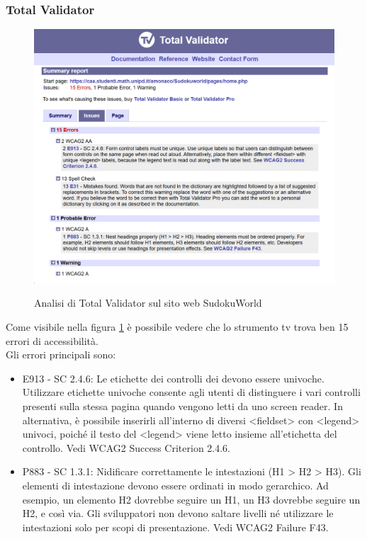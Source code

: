 \subsubsection{Total Validator}
\begin{figure}[H]
    \centering
    \includegraphics[width=0.7\linewidth, alt={Screenshot dell'analisi di Total Validator sul sito web SudokuWorld}]{img/TV_sudoku.png}
    \caption{Analisi di Total Validator sul sito web SudokuWorld}\label{fig:TV_sudoku}
\end{figure}

\noindent Come visibile nella figura \ref{fig:TV_sudoku} è possibile vedere che lo strumento \acrshort{tv} trova ben 15 errori di accessibilità.\\
Gli errori principali sono: 
\begin{itemize}
    \item E913 - SC 2.4.6: Le etichette dei controlli dei  devono essere univoche. Utilizzare etichette univoche consente agli utenti di distinguere i vari controlli presenti sulla stessa pagina quando vengono letti da uno screen reader. In alternativa, è possibile inserirli all’interno di diversi <fieldset> con <legend> univoci, poiché il testo del <legend> viene letto insieme all’etichetta del controllo. Vedi WCAG2 Success Criterion 2.4.6.
    \item P883 - SC 1.3.1: Nidificare correttamente le intestazioni (H1 > H2 > H3). Gli elementi di intestazione devono essere ordinati in modo gerarchico. Ad esempio, un elemento H2 dovrebbe seguire un H1, un H3 dovrebbe seguire un H2, e così via. Gli sviluppatori non devono saltare livelli né utilizzare le intestazioni solo per scopi di presentazione. Vedi WCAG2 Failure F43.
\end{itemize}

